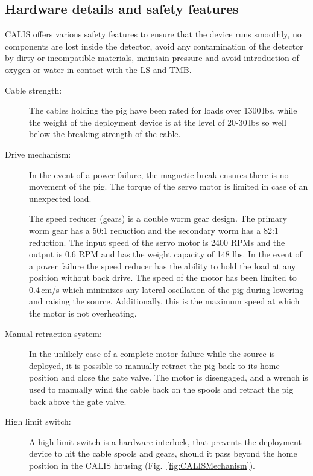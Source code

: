 \subsection{Hardware details and safety features}\label{sec:HardwareDetails}\label{sec:SafetyFeatures}
CALIS offers various safety features to ensure that the device runs smoothly, no components are lost inside the detector, avoid any contamination of the detector by dirty or incompatible materials, maintain pressure and avoid introduction of oxygen or water in contact with the LS and TMB. %

\begin{description}

\item[Cable strength:]
The cables holding the pig have been rated for loads over 1300\,lbs, while the weight of the deployment device is at the level of 20-30\,lbs so well below the breaking strength of the cable. 

\item[Drive mechanism:]
In the event of a power failure, the magnetic break ensures there is no movement of the pig. The torque of the servo motor is limited in case of an unexpected load. 

The speed reducer (gears) is a double worm gear design. The primary worm gear has a 50:1 reduction and the secondary worm has a 82:1 reduction. The input speed of the servo motor is 2400 RPMs and the output is 0.6 RPM and has the weight capacity of 148 lbs. In the event of a power failure the speed reducer has the ability to hold the load at any position without back drive. The speed of the motor has been limited to 0.4\,cm/s which minimizes any lateral oscillation of the pig during lowering and raising the source. Additionally, this is the maximum speed at which the motor is not overheating.

\item[Manual retraction system:]
In the unlikely case of a complete motor failure while the source is deployed, it is possible to manually retract the pig back to its home position and close the gate valve. The motor is disengaged, and a wrench is used to manually wind the cable back on the spools and retract the pig back above the gate valve. 
   
\item[High limit switch:]
A high limit switch is a hardware interlock, that prevents the deployment device to hit the cable spools and gears, should it pass beyond the home position in the CALIS housing (Fig.~\ref{fig:CALISMechanism}). 


\end{description}
